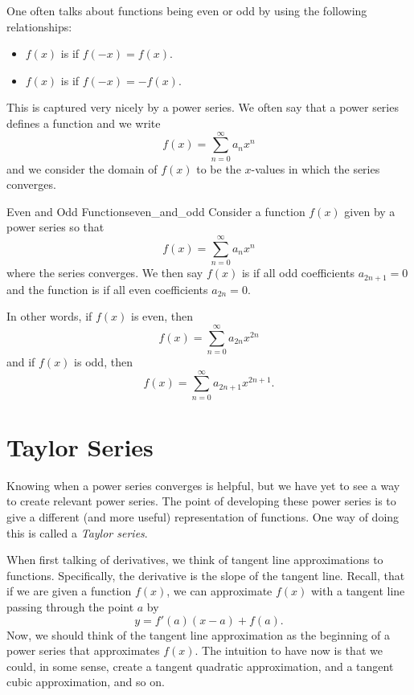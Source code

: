 One often talks about functions being even or odd by using the following relationships:
\begin{itemize}
    \item $f(x)$ is  if $f(-x)=f(x)$.
    \item $f(x)$ is  if $f(-x)=-f(x)$.
\end{itemize}
This is captured very nicely by a power series. We often say that a power series defines a function and we write
\[
f(x)=\sum_{n=0}^\infty a_n x^n
\]
and we consider the domain of $f(x)$ to be the $x$-values in which the series converges.

\begin{prop}{Even and Odd Functions}{even_and_odd}
Consider a function $f(x)$ given by a power series so that
\[
f(x) = \sum_{n=0}^\infty a_n x^n
\]
where the series converges. We then say $f(x)$ is  if all odd coefficients $a_{2n+1}=0$ and the function is  if all even coefficients $a_{2n}=0$.

In other words, if $f(x)$ is even, then
\[
f(x)=\sum_{n=0}^\infty a_{2n}x^{2n}
\]
and if $f(x)$ is odd, then
\[
f(x)=\sum_{n=0}^\infty a_{2n+1}x^{2n+1}.
\]
\end{prop}

\section{Taylor Series}

Knowing when a power series converges is helpful, but we have yet to see a way to create relevant power series.  The point of developing these power series is to give a different (and more useful) representation of functions. One way of doing this is called a \emph{Taylor series}.

When first talking of derivatives, we think of tangent line approximations to functions.  Specifically, the derivative is the slope of the tangent line.  Recall, that if we are given a function $f(x)$, we can approximate $f(x)$ with a tangent line passing through the point $a$ by
\[
y = f'(a)(x-a)+f(a).
\]
Now, we should think of the tangent line approximation as the beginning of a power series that approximates $f(x)$.  The intuition to have now is that we could, in some sense, create a tangent quadratic approximation, and a tangent cubic approximation, and so on.


